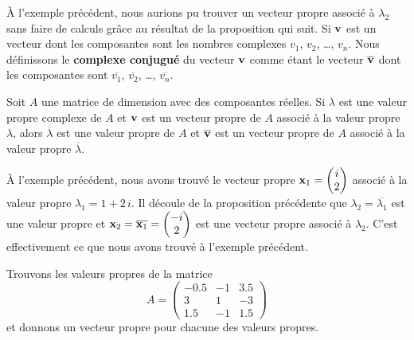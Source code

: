 {À l'exemple précédent, nous aurions pu trouver un vecteur propre associé à
$\lambda_2$ sans faire de calculs grâce au résultat de la proposition qui
suit.  Si $\mathbf{v}$ est un vecteur dont les composantes sont les nombres
complexes $v_1$, $v_2$, \ldots, $v_n$.  Nous définissons le
{\bfseries complexe conjugué} du vecteur $\mathbf{v}$ comme étant le vecteur
$\overline{\mathbf{v}}$ dont les composantes sont $\overline{v_1}$,
$\overline{v_2}$, \ldots, $\overline{v_n}$.

\begin{prop}
Soit $A$ une matrice de dimension \nn avec des composantes réelles.
Si $\lambda$ est une valeur propre complexe de $A$ et $\mathbf{v}$ est un
vecteur propre de $A$ associé à la valeur propre $\lambda$, alors
$\overline{\lambda}$ est une valeur propre de $A$ et
$\overline{\mathbf{v}}$ est un vecteur propre de $A$ associé à la valeur
propre $\overline{\lambda}$.
\end{prop}

À l'exemple précédent, nous avons trouvé le vecteur propre
$\displaystyle \mathbf{x}_1 = \begin{pmatrix} i \\ 2 \end{pmatrix}$
associé à la valeur propre $\lambda_1=1+2\,i$.  Il découle de la
proposition précédente que $\lambda_2 = \overline{\lambda_1}$ est une
valeur propre et
$\displaystyle \mathbf{x}_2 = \overline{\mathbf{x}_1}
= \begin{pmatrix} -i \\ 2 \end{pmatrix}$
est une vecteur propre associé à $\lambda_2$.  C'est effectivement ce
que nous avons trouvé à l'exemple précédent.

\begin{egg}
Trouvons les valeurs propres de la matrice
\[
A = \begin{pmatrix} -0.5 & -1 & 3.5 \\ 3 & 1 & -3 \\
1.5 & -1 & 1.5 \end{pmatrix}
\]
et donnons un vecteur propre pour chacune des valeurs propres.


\end{egg}}
